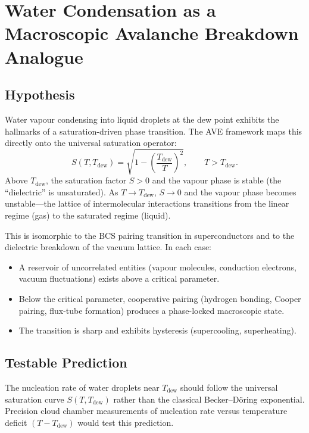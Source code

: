\section{Water Condensation as a Macroscopic Avalanche Breakdown Analogue}
\label{sec:water_condensation}

\subsection{Hypothesis}

Water vapour condensing into liquid droplets at the dew point
exhibits the hallmarks of a saturation-driven phase transition.
The AVE framework maps this directly onto the universal saturation
operator:
\begin{equation}
  S(T, T_{\mathrm{dew}})
  = \sqrt{1 - \left(\frac{T_{\mathrm{dew}}}{T}\right)^2},
  \qquad T > T_{\mathrm{dew}}.
\end{equation}
Above $T_{\mathrm{dew}}$, the saturation factor $S > 0$ and the
vapour phase is stable (the ``dielectric'' is unsaturated).  As
$T \to T_{\mathrm{dew}}$, $S \to 0$ and the vapour phase becomes
unstable---the lattice of intermolecular interactions transitions
from the linear regime (gas) to the saturated regime (liquid).

This is isomorphic to the BCS pairing transition in
superconductors and to the dielectric breakdown of the vacuum
lattice.  In each case:
\begin{itemize}
  \item A reservoir of uncorrelated entities (vapour molecules,
        conduction electrons, vacuum fluctuations) exists above
        a critical parameter.
  \item Below the critical parameter, cooperative pairing
        (hydrogen bonding, Cooper pairing, flux-tube formation)
        produces a phase-locked macroscopic state.
  \item The transition is sharp and exhibits hysteresis
        (supercooling, superheating).
\end{itemize}

\subsection{Testable Prediction}

The nucleation rate of water droplets near $T_{\mathrm{dew}}$
should follow the universal saturation curve $S(T, T_{\mathrm{dew}})$
rather than the classical Becker--D\"{o}ring exponential.
Precision cloud chamber measurements of nucleation rate versus
temperature deficit $(T - T_{\mathrm{dew}})$ would test this
prediction.

